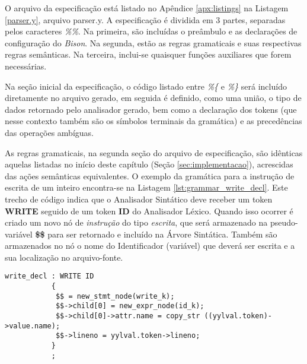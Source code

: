 O arquivo da especificação está listado no Apêndice \ref{apx:listings} na Listagem
\ref{parser.y}, arquivo parser.y. A especificação é dividida em 3 partes,
separadas pelos caracteres \emph{\%\%}. Na primeira, são incluídas o preâmbulo
e as declarações de configuração do \emph{Bison}. Na segunda, estão as regras
gramaticais e suas respectivas regras semânticas. Na terceira, inclui-se
quaisquer funções auxiliares que forem necessárias.

Na seção inicial da especificação, o código listado entre \emph{\%\{} e
\emph{\%\}} será incluído diretamente no arquivo gerado, em seguida é
definido, como uma união, o tipo de dados retornado pelo analisador gerado,
bem como a declaração dos tokens (que nesse contexto também são os símbolos
terminais da gramática) e as precedências das operações ambíguas.

As regras gramaticais, na segunda seção do arquivo de especificação, são
idênticas aquelas listadas no início deste capítulo (Seção
\ref{sec:implementacao}), acrescidas das ações semânticas equivalentes. O
exemplo da gramática para a instrução de escrita de um inteiro encontra-se
na Listagem \ref{lst:grammar_write_decl}. Este trecho de código indica que o
Analisador Sintático deve receber um token \textbf{WRITE} seguido de um token
\textbf{ID} do Analisador Léxico. Quando isso ocorrer é criado um novo nó de
\emph{instrução} do tipo \emph{escrita}, que será armazenado na
pseudo-variável \textbf{\$\$} para ser retornado e incluído na Árvore
Sintática. Também são armazenados no nó o nome do Identificador (variável) que
deverá ser escrita e a sua localização no arquivo-fonte.

\begin{lstlisting}[label=lst:grammar_write_decl,caption=Instrução de Escrita]
write_decl : WRITE ID
           {
            $$ = new_stmt_node(write_k);
            $$->child[0] = new_expr_node(id_k);
            $$->child[0]->attr.name = copy_str ((yylval.token)->value.name);
            $$->lineno = yylval.token->lineno;
           }
           ;
\end{lstlisting}

